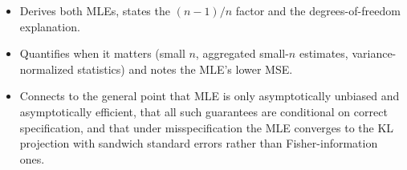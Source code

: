 \begin{interviewq}

\goodgreat
\begin{itemize}
    \item {} Derives both MLEs, states the $(n-1)/n$ factor and the degrees-of-freedom explanation.
    \item {} Quantifies when it matters (small $n$, aggregated small-$n$ estimates, variance-normalized statistics) and notes the MLE's lower MSE.
    \item {} Connects to the general point that MLE is only asymptotically unbiased and asymptotically efficient, that all such guarantees are conditional on correct specification, and that under misspecification the MLE converges to the KL projection with sandwich standard errors rather than Fisher-information ones.
\end{itemize}

\end{interviewq}

